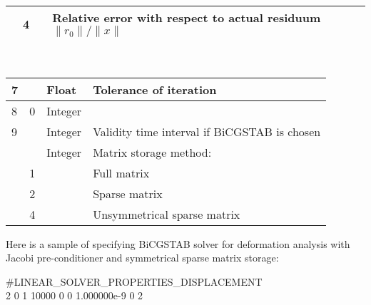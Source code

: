 {\begin{tabular}{|l|c|l|l|}
    &  4 &    &Relative error with respect to actual residuum $\| r_0\|/\| x\|$\\
 \hline %
\end{tabular}\\
\begin{tabular}{|l|c|l|l|}
\hline %
   7\phantom{osition} &\phantom{Value} & Float\phantom{type}  &Tolerance of iteration\phantom{spect to actual residuum $\| r_0\|/\| x\|$}\\
 \hline %
   8& 0  & Integer   & \\
 \hline %
   9&    & Integer  & Validity time interval if BiCGSTAB is chosen\\
    &    & Integer  & Matrix storage method: \\
    &  1  &   & Full matrix \\
    &  2  &   & Sparse matrix \\
    &  4  &   & Unsymmetrical sparse matrix\\
 \hline %
\end{tabular}
}


Here is a sample of specifying BiCGSTAB solver for deformation analysis with Jacobi pre-conditioner
and symmetrical sparse matrix storage:\\

\shadowbox
 {
   \parbox[c]{10cm}
   {
     \#LINEAR\_SOLVER\_PROPERTIES\_DISPLACEMENT\\
     2   0  1  10000  0  0  1.000000e-9  0  2

   }
  }

